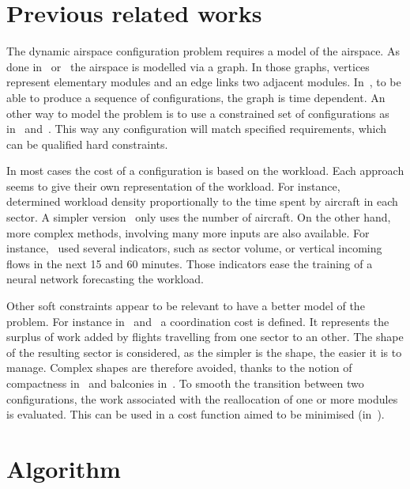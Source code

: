 \documentclass[twoside,twocolumn]{article}
\begin{document}
\section{Previous related works}
\label{sec:previous_related_works}

The dynamic airspace configuration problem requires a model of the airspace. As
done in~\cite{sergeeva2017dynamic} or~\cite{treimuth2016branch} the airspace
is modelled via a graph. In those graphs, vertices represent elementary modules
and an edge links two adjacent modules. In~\cite{treimuth2016branch}, to be
able to produce a sequence of configurations, the graph is time dependent.
An other way to model the problem is to use a constrained set of
configurations as in~\cite{gianazza2010forecasting} and~\cite{bloem2010dynamic}.
This way any configuration will match specified requirements, which can be
qualified hard constraints.

In most cases the cost of a configuration is based on the workload. Each
approach seems to give their own representation of the workload. For instance,
~\cite{bedouet2016} determined workload density proportionally to the time
spent by aircraft in each sector. A simpler version~\cite{sergeeva2017dynamic}
only uses the number of aircraft. On the other hand, more complex methods,
involving many more inputs are also available. For
instance,~\cite{gianazza2010forecasting} used several indicators, such as sector
volume, or vertical incoming flows in the next 15 and 60 minutes. Those
indicators ease the training of a neural network forecasting the workload.

Other soft constraints appear to be relevant to have a better model of
the problem. For instance in~\cite{sergeeva2017dynamic} and~\cite{bedouet2016} a
coordination cost is defined. It represents the surplus of work added by
flights travelling from one sector to an other. The shape of the
resulting sector is considered, as the simpler is
the shape, the easier it is to manage. Complex shapes are therefore avoided,
thanks to the notion of compactness in~\cite{jagare2013constraint} and balconies
in~\cite{sergeeva2017dynamic}. To smooth the transition between two
configurations, the work associated with the reallocation of one or more modules
is evaluated. This can be used in a cost function aimed to be minimised
(in~\cite{bedouet2016}).



\section{Algorithm}
\end{document}
